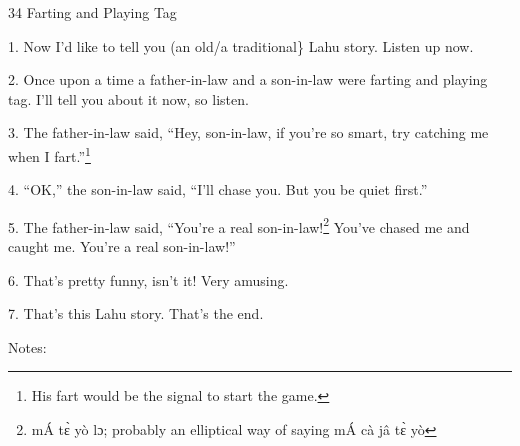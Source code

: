 
34 Farting and Playing Tag

1. Now I'd like to tell you (an old/a traditional\} Lahu story.  Listen up now.

2. Once upon a time a father-in-law and a son-in-law were farting and playing tag.
I'll tell you about it now, so listen.

3. The father-in-law said, ``Hey, son-in-law, if you're so smart, try catching
me when I fart.''\footnote{His fart would be the signal to start the game.}

4. ``OK,'' the son-in-law said, ``I'll chase you.  But you be quiet first.''

5. The father-in-law said, ``You're a real son-in-law!\footnote{mÁ tɛ̀ yò lɔ; probably an elliptical way of saying mÁ cà jâ tɛ̀ yò} You've chased me and
caught me.  You're a real son-in-law!''

6. That's pretty funny, isn't it!  Very amusing.

7. That's this Lahu story.  That's the end.

Notes:

